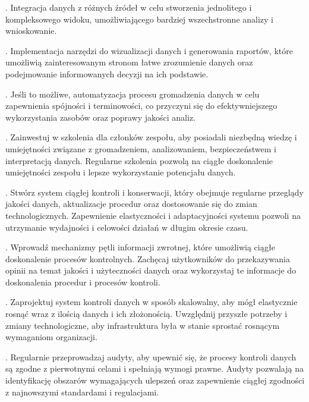 \documentclass[letterpaper,10pt,polish]{sphinxmanual}
\begin{document}
. 
Integracja danych z różnych źródeł w celu stworzenia jednolitego i kompleksowego widoku, umożliwiającego bardziej wszechstronne analizy i wnioskowanie.

. 
Implementacja narzędzi do wizualizacji danych i generowania raportów, które umożliwią zainteresowanym stronom łatwe zrozumienie danych oraz podejmowanie informowanych decyzji na ich podstawie.

. 
Jeśli to możliwe, automatyzacja procesu gromadzenia danych w celu zapewnienia spójności i terminowości, co przyczyni się do efektywniejszego wykorzystania zasobów oraz poprawy jakości analiz.

. 
Zainwestuj w szkolenia dla członków zespołu, aby posiadali niezbędną wiedzę i umiejętności związane z gromadzeniem, analizowaniem, bezpieczeństwem i interpretacją danych. Regularne szkolenia pozwolą na ciągłe doskonalenie umiejętności zespołu i lepsze wykorzystanie potencjału danych.

. 
Stwórz system ciągłej kontroli i konserwacji, który obejmuje regularne przeglądy jakości danych, aktualizacje procedur oraz dostosowanie się do zmian technologicznych. Zapewnienie elastyczności i adaptacyjności systemu pozwoli na utrzymanie wydajności i celowości działań w długim okresie czasu.

. 
Wprowadź mechanizmy pętli informacji zwrotnej, które umożliwią ciągłe doskonalenie procesów kontrolnych. Zachęcaj użytkowników do przekazywania opinii na temat jakości i użyteczności danych oraz wykorzystaj te informacje do doskonalenia procedur i procesów kontroli.

. 
Zaprojektuj system kontroli danych w sposób skalowalny, aby mógł elastycznie rosnąć wraz z ilością danych i ich złożonością. Uwzględnij przyszłe potrzeby i zmiany technologiczne, aby infrastruktura była w stanie sprostać rosnącym wymaganiom organizacji.

. 
Regularnie przeprowadzaj audyty, aby upewnić się, że procesy kontroli danych są zgodne z pierwotnymi celami i spełniają wymogi prawne. Audyty pozwalają na identyfikację obszarów wymagających ulepszeń oraz zapewnienie ciągłej zgodności z najnowszymi standardami i regulacjami.
\end{document}
